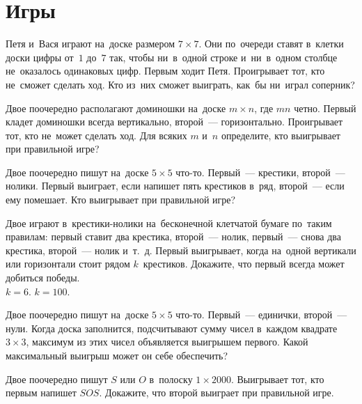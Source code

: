 
\section*{Игры}


\begin{problems}

\item
Петя и~Вася играют на~доске размером $7 \times 7$.
Они по~очереди ставят в~клетки доски цифры от~$1$ до~$7$ так, чтобы ни~в~одной
строке и~ни~в~одном столбце не~оказалось одинаковых цифр.
Первым ходит Петя.
Проигрывает тот, кто не~сможет сделать ход.
Кто из~них сможет выиграть, как~бы ни~играл соперник?

\item
Двое поочередно располагают доминошки на~доске $m \times n$, где $m n$ четно.
Первый кладет доминошки всегда вертикально, второй~--- горизонтально.
Проигрывает тот, кто не~может сделать ход.
Для всяких $m$ и~$n$ определите, кто выигрывает при правильной игре?

\item
Двое поочередно пишут на~доске $5 \times 5$ что-то.
Первый~--- крестики, второй~--- нолики.
Первый выиграет, если напишет пять крестиков в~ряд, второй~--- если ему
помешает.
Кто выигрывает при правильной игре?

\item
Двое играют в~крестики-нолики на~бесконечной клетчатой бумаге по~таким
правилам: первый ставит два крестика, второй~--- нолик, первый~--- снова два
крестика, второй~--- нолик и~т.~д.
Первый выигрывает, когда на~одной вертикали или горизонтали стоит рядом
$k$~крестиков.
Докажите, что первый всегда может добиться победы.
\\
\subproblem $k = 6$.
\qquad
\subproblem $k = 100$.

\item
Двое поочередно пишут на~доске $5 \times 5$ что-то.
Первый~--- единички, второй~--- нули.
Когда доска заполнится, подсчитывают сумму чисел в~каждом
квадрате $3 \times 3$, максимум из этих чисел объявляется выигрышем первого.
Какой максимальный выигрыш может он себе обеспечить?

\item
Двое поочередно пишут $S$ или $O$ в~полоску $1 \times 2000$.
Выигрывает тот, кто первым напишет $SOS$.
Докажите, что второй выиграет при правильной игре.

\end{problems}

